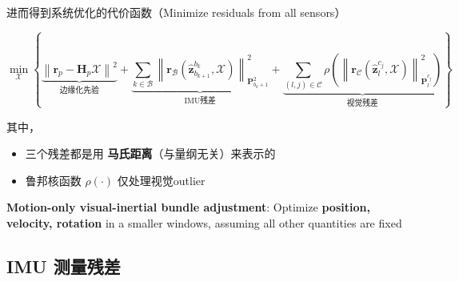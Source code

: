\documentclass[12pt,a4paper]{article}
\begin{document}
进而得到系统优化的代价函数（Minimize residuals from all sensors）

\begin{equation}
\min_{\mathcal{X}}
\left\{
\underbrace{
\left\|\mathbf{r}_{p}-\mathbf{H}_{p} \mathcal{X}\right\|^{2}
}_\text{边缘化先验}
+
\underbrace{
\sum_{k \in \mathcal{B}}\left\|\mathbf{r}_{\mathcal{B}}\left(\hat{\mathbf{z}}_{b_{k+1}}^{b_{k}}, \mathcal{X}\right)\right\|_{\mathbf{P}_{b_{k}+1}^{2}}^{2}
}_\text{IMU残差}
+
\underbrace{
\sum_{(l, j) \in \mathcal{C}} \rho\left(\left\|\mathbf{r}_{\mathcal{C}}\left(\hat{\mathbf{z}}_{l}^{c_{j}}, \mathcal{X}\right)\right\|_{\mathbf{P}_{l}^{c_{j}}}^{2}\right)
}_\text{视觉残差}
\right\}
\end{equation}

其中，
\begin{itemize}
\item 三个残差都是用 \textbf{马氏距离}（与量纲无关）来表示的
\item 鲁邦核函数 $\rho(\cdot)$ 仅处理视觉outlier
\end{itemize}

\textbf{Motion-only visual-inertial bundle adjustment}: Optimize \textbf{position, velocity, rotation} in a smaller windows, assuming all other quantities are fixed

\subsection{IMU 测量残差}
\end{document}
